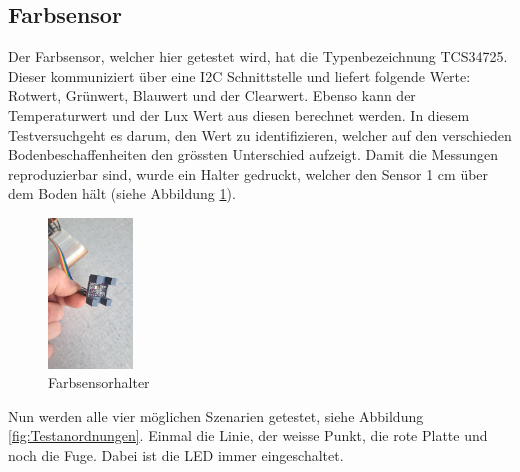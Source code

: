 \subsection{Farbsensor}
Der Farbsensor, welcher hier getestet wird, hat die Typenbezeichnung TCS34725. Dieser kommuniziert über eine I2C Schnittstelle und liefert folgende Werte: Rotwert, Grünwert, Blauwert und der Clearwert. Ebenso kann der Temperaturwert und der Lux Wert aus diesen berechnet werden. In diesem Testversuchgeht es darum, den Wert zu identifizieren, welcher auf den verschieden Bodenbeschaffenheiten den grössten Unterschied aufzeigt. Damit die Messungen reproduzierbar sind, wurde ein Halter gedruckt, welcher den Sensor 1 cm über dem Boden hält (siehe Abbildung \ref{fig:Farbsensorhalter}).


\begin{figure}[H] %
    \centering
    \includegraphics[width=0.2\textwidth]{img/sensortest/FarbsensorHalter.jpg} %
    \caption{Farbsensorhalter}
    \label{fig:Farbsensorhalter} %
\end{figure}

Nun werden alle vier möglichen Szenarien getestet, siehe Abbildung \ref{fig:Testanordnungen}. Einmal die Linie, der weisse Punkt, die rote Platte und noch die Fuge. Dabei ist die LED immer eingeschaltet.

